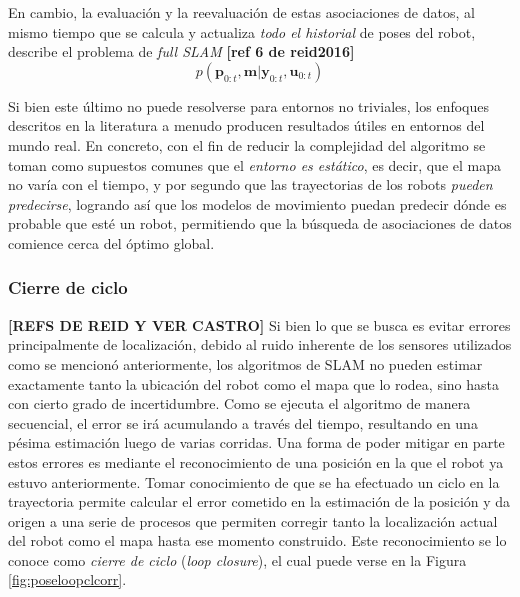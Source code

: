 En cambio, la evaluación y la reevaluación de estas asociaciones de datos, al mismo tiempo que se calcula y actualiza \textit{todo el historial} de poses del robot, describe el problema de \textit{full SLAM} \textbf{[ref 6 de reid2016]}
\begin{equation}
    p(\bm{p}_{0:t},\bm{m}|\bm{y}_{0:t},\bm{u}_{0:t})
\end{equation}

Si bien este último no puede resolverse para entornos no triviales, los enfoques descritos en la literatura a menudo producen resultados útiles en entornos del mundo real. En concreto, con el fin de reducir la complejidad del algoritmo se toman como supuestos comunes que el \textit{entorno es estático}, es decir, que el mapa no varía con el tiempo, y por segundo que las trayectorias de los robots \textit{pueden predecirse}, logrando así que los modelos de movimiento puedan predecir dónde es probable que esté un robot, permitiendo que la búsqueda de asociaciones de datos comience cerca del óptimo global.

\subsubsection{Cierre de ciclo}
\textbf{[REFS DE REID Y VER CASTRO]}
Si bien lo que se busca es evitar errores principalmente de localización, debido al ruido inherente de los sensores utilizados como se mencionó anteriormente, los algoritmos de SLAM no pueden estimar exactamente tanto la ubicación del robot como el mapa que lo rodea, sino hasta con cierto grado de incertidumbre. Como se ejecuta el algoritmo de manera secuencial, el error se irá acumulando a través del tiempo, resultando en una pésima estimación luego de varias corridas. Una forma de poder mitigar en parte estos errores es mediante el reconocimiento de una posición en la que el robot ya estuvo anteriormente. Tomar conocimiento de que se ha efectuado un ciclo en la trayectoria permite calcular el error cometido en la estimación de la posición y da origen a una serie de procesos que permiten corregir tanto la localización actual del robot como el mapa hasta ese momento construido. Este reconocimiento se lo conoce como \textit{cierre de ciclo} (\textit{loop closure}), el cual puede verse en la Figura \ref{fig:poseloopclcorr}.



